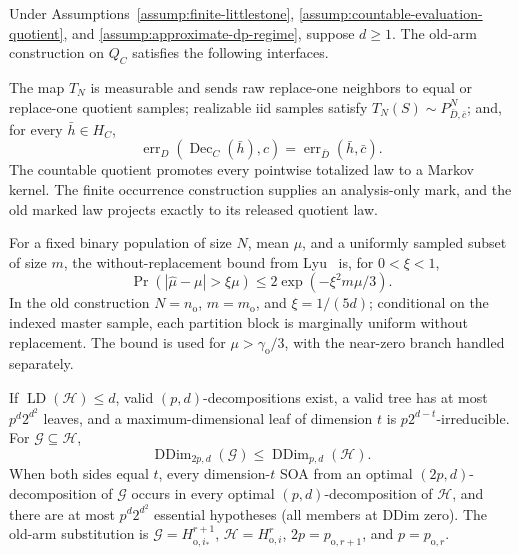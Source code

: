 \begin{proposition}\label{prop:step-015-interfaces}
Under Assumptions~\ref{assump:finite-littlestone},
\ref{assump:countable-evaluation-quotient}, and
\ref{assump:approximate-dp-regime}, suppose \(d\ge1\).  The old-arm
construction on \(Q_C\) satisfies the following interfaces.

The map \(T_N\) is measurable and sends raw replace-one neighbors to equal
or replace-one quotient samples; realizable iid samples satisfy
\(T_N(S)\sim P_{\bar D,\bar c}^N\); and, for every \(\bar h\in H_C\),
\[
 \operatorname{err}_D(\operatorname{Dec}_C(\bar h),c)
 =\operatorname{err}_{\bar D}(\bar h,\bar c).
 \tag{D1}
\]
The countable quotient promotes every pointwise totalized law to a Markov
kernel.  The finite occurrence construction supplies an analysis-only mark,
and the old marked law projects exactly to its released quotient law.

For a fixed binary population of size \(N\), mean \(\mu\), and a uniformly
sampled subset of size \(m\), the without-replacement bound from
Lyu~\citep{lyu2025} is, for \(0<\xi<1\),
\[
 \Pr(|\widehat\mu-\mu|>\xi\mu)
 \le2\exp(-\xi^2m\mu/3).
 \tag{C1}
\]
In the old construction \(N=n_{\mathrm o}\), \(m=m_{\mathrm o}\), and
\(\xi=1/(5d)\); conditional on the indexed master sample, each partition
block is marginally uniform without replacement.  The bound is used for
\(\mu>\gamma_{\mathrm o}/3\), with the near-zero branch handled separately.

If \(\operatorname{LD}(\mathcal H)\le d\), valid \((p,d)\)-decompositions
exist, a valid tree has at most \(p^d2^{d^2}\) leaves, and a
maximum-dimensional leaf of dimension \(t\) is
\(p2^{d-t}\)-irreducible.  For \(\mathcal G\subseteq\mathcal H\),
\[
 \operatorname{DDim}_{2p,d}(\mathcal G)
 \le\operatorname{DDim}_{p,d}(\mathcal H).
 \tag{C2}
\]
When both sides equal \(t\), every dimension-\(t\) SOA from an optimal
\((2p,d)\)-decomposition of \(\mathcal G\) occurs in every optimal
\((p,d)\)-decomposition of \(\mathcal H\), and there are at most
\(p^d2^{d^2}\) essential hypotheses (all members at DDim zero).  The
old-arm substitution is
\(\mathcal G=H_{\mathrm o,i_*}^{r+1}\),
\(\mathcal H=H_{\mathrm o,i}^{r}\),
\(2p=p_{\mathrm o,r+1}\), and \(p=p_{\mathrm o,r}\).


\end{proposition}
